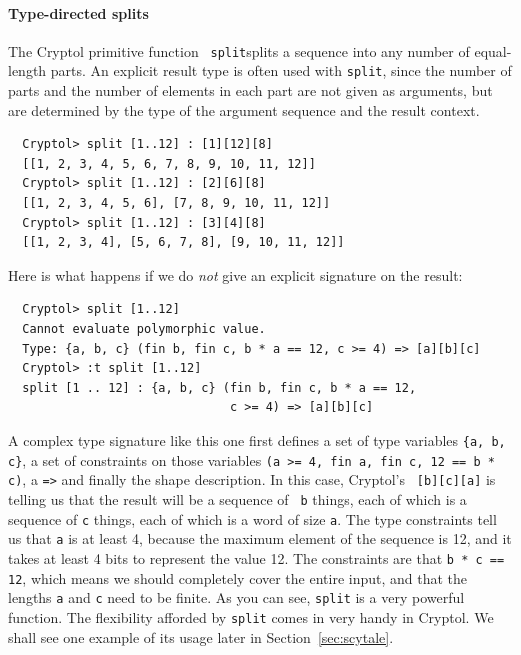 \paragraph*{Type-directed splits} The Cryptol primitive function {\tt
  split}\indSplit splits a sequence into any number of equal-length
parts. An explicit result type is often used with {\tt split}, since
the number of parts and the number of elements in each part are not
given as arguments, but are determined by the type of the argument
sequence and the result context.
\begin{Verbatim}
  Cryptol> split [1..12] : [1][12][8]
  [[1, 2, 3, 4, 5, 6, 7, 8, 9, 10, 11, 12]]
  Cryptol> split [1..12] : [2][6][8]
  [[1, 2, 3, 4, 5, 6], [7, 8, 9, 10, 11, 12]]
  Cryptol> split [1..12] : [3][4][8]
  [[1, 2, 3, 4], [5, 6, 7, 8], [9, 10, 11, 12]]
\end{Verbatim}
Here is what happens if we do {\em not} give an explicit signature on
the result:\indSignature
\begin{Verbatim}
  Cryptol> split [1..12]
  Cannot evaluate polymorphic value.
  Type: {a, b, c} (fin b, fin c, b * a == 12, c >= 4) => [a][b][c]
  Cryptol> :t split [1..12]
  split [1 .. 12] : {a, b, c} (fin b, fin c, b * a == 12,
                               c >= 4) => [a][b][c]
\end{Verbatim}

A complex type signature like this one first defines a set of type
variables {\tt \Verb|{a, b, c}|}, a set of constraints on those
variables {\tt \Verb|(a >= 4, fin a, fin c, 12 == b * c)|}, a {\tt =>}
and finally the shape description.  In this case, Cryptol's {\tt
  [b][c][a]} is telling us that the result will be a sequence of {\tt
  b} things, each of which is a sequence of {\tt c} things, each of
which is a word of size {\tt a}. The type constraints tell us that
{\tt a} is at least 4, because the maximum element of the sequence is 12,
and it takes at least 4 bits to represent the value 12.  The
constraints are that {\tt b * c == 12}, which means we should
completely cover the entire input, and that the lengths {\tt a} and
{\tt c} need to be finite.  As you can see, {\tt split} is a very
powerful function. The flexibility afforded by {\tt split} comes in
very handy in Cryptol.  We shall see one example of its usage later in
Section~\ref{sec:scytale}.

